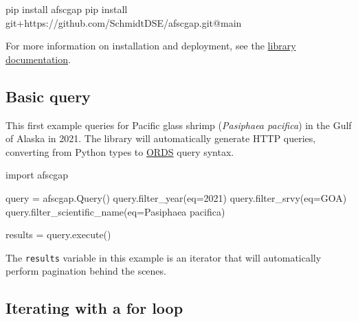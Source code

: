 \documentclass[
  letterpaper,
  oneside,
  open=any]{scrbook}
\newenvironment{Shaded}{\begin{snugshade}}{\end{snugshade}}
\newcommand{\AttributeTok}[1]{\textcolor[rgb]{0.40,0.45,0.13}{#1}}
\newcommand{\DecValTok}[1]{\textcolor[rgb]{0.68,0.00,0.00}{#1}}
\newcommand{\ErrorTok}[1]{\textcolor[rgb]{0.68,0.00,0.00}{#1}}
\newcommand{\FunctionTok}[1]{\textcolor[rgb]{0.28,0.35,0.67}{#1}}
\newcommand{\NormalTok}[1]{\textcolor[rgb]{0.00,0.23,0.31}{#1}}
\newcommand{\OtherTok}[1]{\textcolor[rgb]{0.00,0.23,0.31}{#1}}
\newcommand{\SpecialCharTok}[1]{\textcolor[rgb]{0.37,0.37,0.37}{#1}}
\newcommand{\StringTok}[1]{\textcolor[rgb]{0.13,0.47,0.30}{#1}}
\begin{document}
\begin{Shaded}
\begin{Highlighting}[]
\NormalTok{pip install afscgap}
\NormalTok{pip install git}\SpecialCharTok{+}\NormalTok{https}\SpecialCharTok{:}\ErrorTok{//}\NormalTok{github.com}\SpecialCharTok{/}\NormalTok{SchmidtDSE}\SpecialCharTok{/}\NormalTok{afscgap.git}\SpecialCharTok{@}\NormalTok{main}
\end{Highlighting}
\end{Shaded}

For more information on installation and deployment, see the
\href{https://pyafscgap.org}{library documentation}.

\hypertarget{basic-query}{%
\subsection{Basic query}\label{basic-query}}

This first example queries for Pacific glass shrimp (\emph{Pasiphaea
pacifica}) in the Gulf of Alaska in 2021. The library will automatically
generate HTTP queries, converting from Python types to
\href{https://www.oracle.com/database/technologies/appdev/rest.html}{ORDS}
query syntax.

\begin{Shaded}
\begin{Highlighting}[]
\NormalTok{import afscgap}

\NormalTok{query }\OtherTok{=} \FunctionTok{afscgap.Query}\NormalTok{()}
\FunctionTok{query.filter\_year}\NormalTok{(}\AttributeTok{eq=}\DecValTok{2021}\NormalTok{)}
\FunctionTok{query.filter\_srvy}\NormalTok{(}\AttributeTok{eq=}\StringTok{\textquotesingle{}GOA\textquotesingle{}}\NormalTok{)}
\FunctionTok{query.filter\_scientific\_name}\NormalTok{(}\AttributeTok{eq=}\StringTok{\textquotesingle{}Pasiphaea pacifica\textquotesingle{}}\NormalTok{)}

\NormalTok{results }\OtherTok{=} \FunctionTok{query.execute}\NormalTok{()}
\end{Highlighting}
\end{Shaded}

The \texttt{results} variable in this example is an iterator that will
automatically perform pagination behind the scenes.

\hypertarget{iterating-with-a-for-loop}{%
\subsection{Iterating with a for loop}\label{iterating-with-a-for-loop}}
\end{document}
